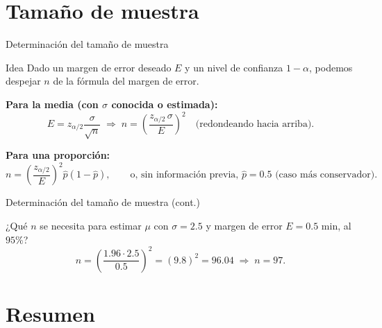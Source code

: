 \documentclass[aspectratio=169,11pt]{beamer}
\begin{document}
\section{Tamaño de muestra}

\begin{frame}{Determinación del tamaño de muestra}
\begin{block}{Idea}
Dado un margen de error deseado $E$ y un nivel de confianza $1-\alpha$, podemos despejar $n$ de la fórmula del margen de error.
\end{block}

\textbf{Para la media (con $\sigma$ conocida o estimada):}
\[
E = z_{\alpha/2}\frac{\sigma}{\sqrt n} \;\Longrightarrow\; n = \left(\frac{z_{\alpha/2}\,\sigma}{E}\right)^2 \quad \text{(redondeando hacia arriba)}.
\]

\textbf{Para una proporción:}
\[
n = \left(\frac{z_{\alpha/2}}{E}\right)^2 \widehat p(1-\widehat p), \qquad \text{o, sin información previa, } \widehat p=0.5 \text{ (caso más conservador)}.
\]

\end{frame}

\begin{frame}{Determinación del tamaño de muestra (cont.)}
\begin{example}
¿Qué $n$ se necesita para estimar $\mu$ con $\sigma=2.5$ y margen de error $E=0.5$ min, al $95\%$?
\[
n = \left(\frac{1.96\cdot 2.5}{0.5}\right)^2 = (9.8)^2 = 96.04 \;\Longrightarrow\; n=97.
\]
\end{example}
\end{frame}

\section{Resumen}
\end{document}
